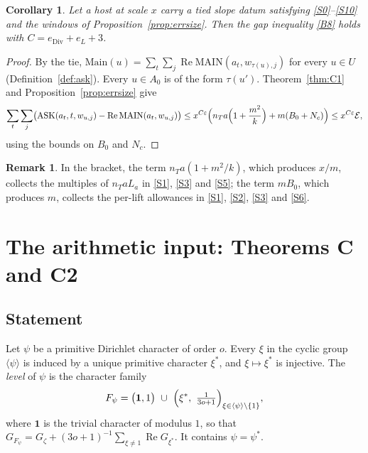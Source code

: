 \documentclass[11pt]{amsart}
\newcommand{\eps}{\varepsilon}
\newcommand{\re}{\operatorname{Re}}
\newcommand{\ASK}{\mathrm{ASK}}
\newcommand{\MAIN}{\mathrm{MAIN}}
\theoremstyle{plain}
\newtheorem{corollary}[theorem]{Corollary}
\theoremstyle{definition}
\newtheorem{remark}[theorem]{Remark}
\numberwithin{equation}{section}
\begin{document}
\begin{corollary}\label{cor:gap}
Let a host at scale $x$ carry a tied slope datum satisfying \ref{S0}--\ref{S10} and the windows of
Proposition~\ref{prop:errsize}. Then the gap inequality \ref{B8} holds with
$C=e_{\mathrm{Div}}+e_L+3$.
\end{corollary}

\begin{proof}
By the tie, $\mathrm{Main}(u)=\sum_t\sum_j\re\MAIN(a_t,w_{\tau(u),j})$ for every $u\in U$
(Definition~\ref{def:ask}). Every $u\in A_0$ is of the form $\tau(u')$. Theorem~\ref{thm:C1} and
Proposition~\ref{prop:errsize} give
\[
\sum_t\sum_j\bigl(\ASK(a_t,t,w_{u,j})-\re\MAIN(a_t,w_{u,j})\bigr)\le x^{C\eps}\Bigl(n_Ta\Bigl(1+\frac{m^2}k\Bigr)+m(B_0+N_c)\Bigr)\le x^{C\eps}\mathcal E,
\]
using the bounds on $B_0$ and $N_c$.
\end{proof}

\begin{remark}
In the bracket, the term $n_Ta(1+m^2/k)$, which produces $x/m$, collects the multiples of
$n_TaL_a$ in \ref{S1}, \ref{S3} and \ref{S5}; the term $mB_0$, which produces $m$, collects the
per-lift allowances in \ref{S1}, \ref{S2}, \ref{S3} and \ref{S6}.
\end{remark}
\section{The arithmetic input: Theorems C and C2}\label{sec:C}

\subsection{Statement}

Let $\psi$ be a primitive Dirichlet character of order $o$. Every $\xi$ in the cyclic group
$\langle\psi\rangle$ is induced by a unique primitive character $\xi^*$, and $\xi\mapsto\xi^*$ is
injective. The \emph{level} of $\psi$ is the character family
\[
F_\psi=\bigl(\mathbf 1,1\bigr)\ \cup\ \Bigl(\xi^*,\ \tfrac{1}{3o+1}\Bigr)_{\xi\in\langle\psi\rangle\setminus\{1\}},
\]
where $\mathbf 1$ is the trivial character of modulus $1$, so that
$G_{F_\psi}=G_\zeta+(3o+1)^{-1}\sum_{\xi\neq1}\re G_{\xi^*}$. It contains $\psi=\psi^*$.
\end{document}
